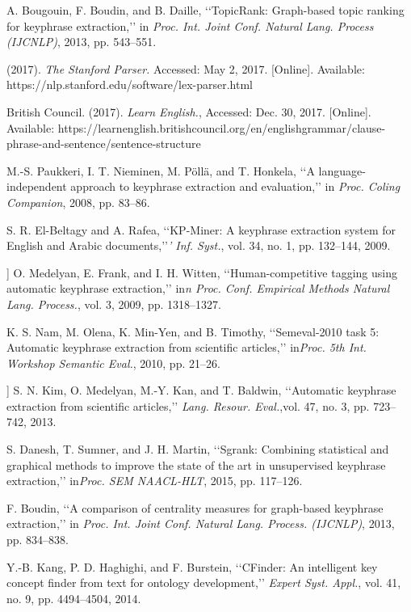 \documentclass{ieeeaccess}
\begin{document}
\begin{thebibliography}{00}

A. Bougouin, F. Boudin, and B. Daille, ‘‘TopicRank: Graph-based topic ranking for keyphrase extraction,’’ in \textit{Proc. Int. Joint Conf. Natural Lang. Process (IJCNLP)}, 2013, pp. 543–551.

(2017). \textit{The Stanford Parser.} Accessed: May 2, 2017. [Online]. Available:
https://nlp.stanford.edu/software/lex-parser.html
 

British Council. (2017). \textit{Learn English.}, Accessed: Dec. 30, 2017.
[Online]. Available: https://learnenglish.britishcouncil.org/en/englishgrammar/clause-phrase-and-sentence/sentence-structure

 M.-S. Paukkeri, I. T. Nieminen, M. Pöllä, and T. Honkela, ‘‘A
language-independent approach to keyphrase extraction and evaluation,’’
in \textit{Proc. Coling Companion}, 2008, pp. 83–86.

S. R. El-Beltagy and A. Rafea, ‘‘KP-Miner: A keyphrase extraction system
for English and Arabic documents,’’\textit{’ Inf. Syst.}, vol. 34, no. 1, pp. 132–144,
2009.

] O. Medelyan, E. Frank, and I. H. Witten, ‘‘Human-competitive tagging
using automatic keyphrase extraction,’’ in\textit{n Proc. Conf. Empirical Methods
Natural Lang. Process.}, vol. 3, 2009, pp. 1318–1327.

K. S. Nam, M. Olena, K. Min-Yen, and B. Timothy, ‘‘Semeval-2010 task
5: Automatic keyphrase extraction from scientific articles,’’ in\textit{Proc. 5th
Int. Workshop Semantic Eval.}, 2010, pp. 21–26.

] S. N. Kim, O. Medelyan, M.-Y. Kan, and T. Baldwin, ‘‘Automatic
keyphrase extraction from scientific articles,’’ \textit{Lang. Resour. Eval.},vol. 47,
no. 3, pp. 723–742, 2013.


S. Danesh, T. Sumner, and J. H. Martin, ‘‘Sgrank: Combining statistical and
graphical methods to improve the state of the art in unsupervised keyphrase
extraction,’’ in\textit{Proc. SEM NAACL-HLT}, 2015, pp. 117–126.

F. Boudin, ‘‘A comparison of centrality measures for graph-based
keyphrase extraction,’’ in \textit{Proc. Int. Joint Conf. Natural Lang.
Process. (IJCNLP)}, 2013, pp. 834–838.

Y.-B. Kang, P. D. Haghighi, and F. Burstein, ‘‘CFinder: An intelligent key
concept finder from text for ontology development,’’ \textit{Expert Syst. Appl.},
vol. 41, no. 9, pp. 4494–4504, 2014.


\end{thebibliography}
\end{document}
